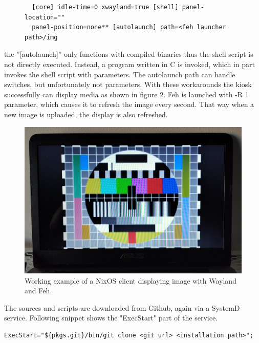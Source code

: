 \begin{figure}
\begin{lstlisting} 
  [core] idle-time=0 xwayland=true [shell] panel-location=""
  panel-position=none** [autolaunch] path=<feh launcher path>/img
\end{lstlisting}
\label{westonconf}
\end{figure}

the ''[autolaunch]'' only functions with compiled binaries thus the
shell script is not directly executed. Instead, a program written in C
is invoked, which in part invokes the shell script with
parameters. The autolaunch path can handle switches, but unfortunately
not parameters. With these workarounds the kiosk successfully can
display media as shown in figure \ref{testimage}. Feh is launched with
-R 1 parameter, which causes it to refresh the image every
second. That way when a new image is uploaded, the display is also
refreshed.

\begin{figure}
    \centering \includegraphics[scale=0.2]{latex/kuvat/testimage.jpeg}
    \caption{Working example of a NixOS client displaying image with
      Wayland and Feh.}
    \label{testimage}
\end{figure}

The sources and scripts are downloaded from Github, again via a
SystemD service. Following snippet shows the "ExecStart" part of the
service.

\begin{lstlisting}
ExecStart="${pkgs.git}/bin/git clone <git url> <installation path>";
\end{lstlisting}


